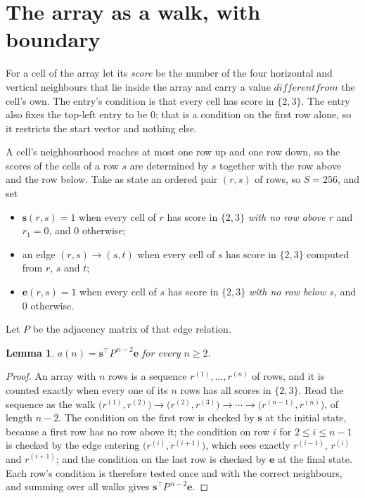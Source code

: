 \documentclass[11pt,a4paper]{article}
\theoremstyle{plain}
\newtheorem{lemma}[theorem]{Lemma}
\theoremstyle{definition}
\begin{document}
\section{The array as a walk, with boundary}

For a cell of the array let its \emph{score} be the number of the four horizontal and vertical neighbours that lie inside
the array and carry a value $different from$ the cell's own. The entry's condition is that every cell
has score in $\{2,3\}$. The entry also fixes the top-left entry to be $0$; that is a condition on the first row alone, so it restricts the start vector and nothing else.

A cell's neighbourhood reaches at most one row up and one row down, so the scores of the
cells of a row $s$ are determined by $s$ together with the row above and the row below.
Take as state an ordered pair $(r,s)$ of rows, so $S=256$, and set
\begin{itemize}
\item $\mathbf{s}(r,s)=1$ when every cell of $r$ has score in $\{2,3\}$ \emph{with no row
above $r$} and $r_1=0$, and $0$ otherwise;
\item an edge $(r,s)\to(s,t)$ when every cell of $s$ has score in $\{2,3\}$ computed from
$r$, $s$ and $t$;
\item $\mathbf{e}(r,s)=1$ when every cell of $s$ has score in $\{2,3\}$ \emph{with no row
below $s$}, and $0$ otherwise.
\end{itemize}
Let $P$ be the adjacency matrix of that edge relation.

\begin{lemma}\label{lem:walk}
$a(n)=\mathbf{s}^{\!\top}P^{\,n-2}\mathbf{e}$ for every $n\ge2$.
\end{lemma}

\begin{proof}
An array with $n$ rows is a sequence $r^{(1)},\dots,r^{(n)}$ of rows, and it is counted
exactly when every one of its $n$ rows has all scores in $\{2,3\}$. Read the sequence as the
walk $\bigl(r^{(1)},r^{(2)}\bigr)\to\bigl(r^{(2)},r^{(3)}\bigr)\to\cdots\to
\bigl(r^{(n-1)},r^{(n)}\bigr)$, of length $n-2$. The condition on the first row is
checked by $\mathbf{s}$ at the initial state, because a first row has no row above it; the
condition on row $i$ for $2\le i\le n-1$ is checked by the edge entering
$\bigl(r^{(i)},r^{(i+1)}\bigr)$, which sees exactly $r^{(i-1)}$, $r^{(i)}$ and
$r^{(i+1)}$; and the condition on the last row is checked by $\mathbf{e}$ at the final
state. Each row's condition is therefore tested once and with the correct neighbours, and
summing over all walks gives $\mathbf{s}^{\!\top}P^{\,n-2}\mathbf{e}$.
\end{proof}
\end{document}
